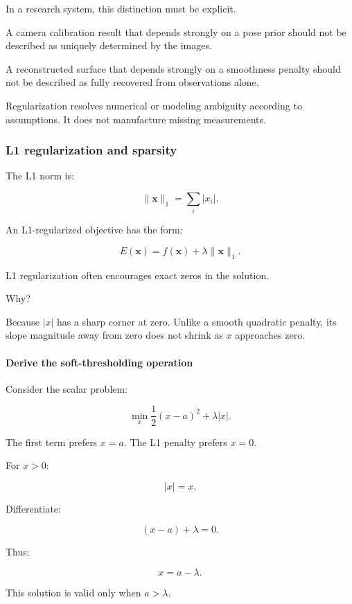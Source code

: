 In a research system, this distinction must be explicit.

A camera calibration result that depends strongly on a pose prior should not be described as uniquely determined by the images.

A reconstructed surface that depends strongly on a smoothness penalty should not be described as fully recovered from observations alone.

Regularization resolves numerical or modeling ambiguity according to assumptions. It does not manufacture missing measurements.

\subsubsection{L1 regularization and sparsity}\label{02-foundations-ii-ch027-l1-regularization-and-sparsity}

The L1 norm is:

\[
\boxed{ \|\mathbf x\|_1=\sum_i|x_i| }.
\]

An L1-regularized objective has the form:

\[
\boxed{ E(\mathbf x)= f(\mathbf x)+\lambda\|\mathbf x\|_1 }.
\]

L1 regularization often encourages exact zeros in the solution.

Why?

Because \(|x|\) has a sharp corner at zero. Unlike a smooth quadratic penalty, its slope magnitude away from zero does not shrink as \(x\) approaches zero.

\paragraph{Derive the soft-thresholding operation}\label{02-foundations-ii-ch027-derive-the-soft-thresholding-operation}

Consider the scalar problem:

\[
\min_x \frac12(x-a)^2+\lambda|x|.
\]

The first term prefers \(x=a\). The L1 penalty prefers \(x=0\).

For \(x>0\):

\[
|x|=x.
\]

Differentiate:

\[
(x-a)+\lambda=0.
\]

Thus:

\[
x=a-\lambda.
\]

This solution is valid only when \(a>\lambda\).

